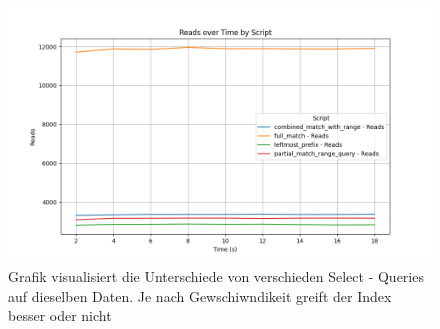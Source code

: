 \begin{figure}[!ht]
    \centering
    \includegraphics[width=.8\textwidth]{PNGs/Index/Hash/Query_Reads}
    \caption[Hash - Selects - Ergebnis]{Grafik visualisiert die Unterschiede von verschieden Select - Queries auf dieselben Daten. Je nach Gewschiwndikeit greift der Index besser oder nicht }
    \label{fig:hash-query-reads}
\end{figure}